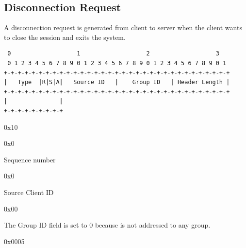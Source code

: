 \documentclass{article}
\begin{document}
\subsection{Disconnection Request}
A disconnection request is generated from client to server when the client wants to close the session and exits the system. 
\begin{verbatim}  
 0                   1                   2                   3  
 0 1 2 3 4 5 6 7 8 9 0 1 2 3 4 5 6 7 8 9 0 1 2 3 4 5 6 7 8 9 0 1
+-+-+-+-+-+-+-+-+-+-+-+-+-+-+-+-+-+-+-+-+-+-+-+-+-+-+-+-+-+-+-+-+
|   Type  |R|S|A|   Source ID   |    Group ID   | Header Length |
+-+-+-+-+-+-+-+-+-+-+-+-+-+-+-+-+-+-+-+-+-+-+-+-+-+-+-+-+-+-+-+-+
|               |
+-+-+-+-+-+-+-+-+
\end{verbatim}
\begin{description}[align=left]
    \item [Type:] 0x10
        
    \item [Reserved:] 0x0
        
    \item [Sequence:] Sequence number
    
    \item [Acknowledgement:] 0x0
    
    \item [Source ID:] Source Client ID
        
    \item [Group ID:] 0x00
    \begin{flushleft}
        The Group ID field is set to 0 because is not addressed to any group.
    \end{flushleft}
    
    \item [Header Length:] 0x0005

\end{description}
\end{document}
